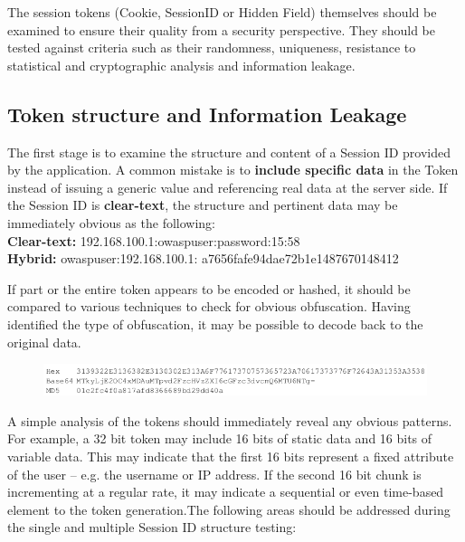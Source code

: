 			The session tokens (Cookie, SessionID or Hidden Field) themselves should be examined to 
			ensure their quality from a security perspective. They should be tested against criteria 
			such as their randomness, uniqueness, resistance to statistical and cryptographic analysis 
			and information leakage.


		\subsection{Token structure and Information Leakage}
			The first stage is to examine the structure and content of a Session ID provided by 
			the application. A common mistake is to {\bf include specific data} in the Token instead 
			of issuing a generic value and referencing real data at the server side. 
			If the Session ID is {\bf clear-text}, the structure and pertinent data may be immediately
			obvious as the following: \\
			{\bf Clear-text:} {\color{blue} 192.168.100.1:owaspuser:password:15:58} \\
			{\bf Hybrid:} {\color{blue} owaspuser:192.168.100.1: a7656fafe94dae72b1e1487670148412}

			If part or the entire token appears to be encoded or hashed, it should be compared to 
			various techniques to check for obvious obfuscation. Having identified the type of 
			obfuscation, it may be possible to decode back to the original data.

				\begin{figure}[H]
					\includegraphics[width=\textwidth]{pics/cookies.png}
				\end{figure}

			A simple analysis of the tokens should immediately reveal any obvious patterns. 
			For example, a 32 bit token may include 16 bits of static data and 16 bits
			of variable data. This may indicate that the first 16 bits represent a fixed attribute 
			of the user – e.g. the username or IP address. If the second 16 bit chunk is incrementing 
			at a regular rate, it may indicate a sequential or even time-based element to the token
			generation.The following areas should be addressed during the single and multiple Session 
			ID structure testing:

